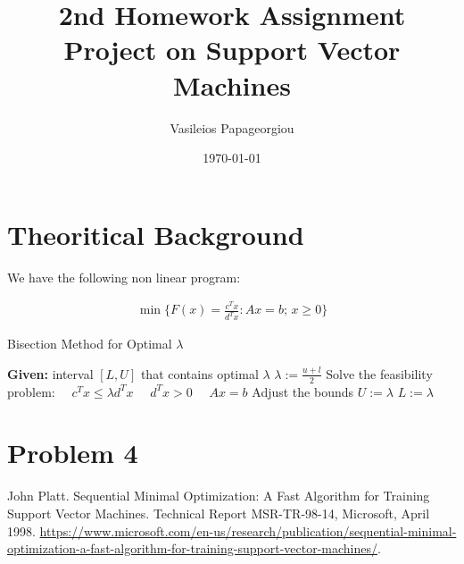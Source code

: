 \documentclass[10pt,a4paper]{article}
\title{2nd Homework Assignment \\ \huge{Project on Support Vector Machines}}
\author{Vasileios Papageorgiou}
\date{\today}
\begin{document}
	\maketitle
	\thispagestyle{fancy}
	
	

\section*{Theoritical Background}

We have the following non linear program:

\begin{equation}\label{eq:3}
	\begin{aligned}
		\min \{ F(x) = \frac{c^T x}{d^T x} : A x = b; \, x \geq 0 \}
	\end{aligned}
\end{equation}



\begin{algorithm}
	\caption{Bisection Method for Optimal $\lambda$}
	\begin{algorithmic}[1]
		\State \textbf{Given:} interval $[L, U]$ that contains optimal $\lambda$
		\Repeat
		\State $\lambda := \frac{u + l}{2}$
		\State Solve the feasibility problem:
		\State $\quad c^T x \leq \lambda d^T x $
		\State $\quad d^T x > 0$
		\State $\quad Ax = b$
		\State Adjust the bounds
		\State $U := \lambda$
		\Else
		\State $L := \lambda$
		\EndIf
	\end{algorithmic}
\end{algorithm}

\section*{Problem 4}
 
\begin{thebibliography}{1}
	
	John Platt.
	\newblock Sequential Minimal Optimization: A Fast Algorithm for Training Support Vector Machines.
	\newblock Technical Report MSR-TR-98-14, Microsoft, April 1998.
	\newblock \url{https://www.microsoft.com/en-us/research/publication/sequential-minimal-optimization-a-fast-algorithm-for-training-support-vector-machines/}.
	
\end{thebibliography}
\end{document}
